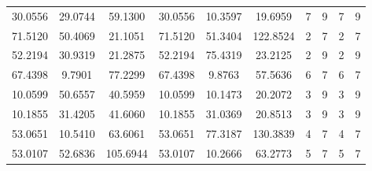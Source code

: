 \documentclass[withoutpreface,bwprint]{cumcmthesis} %
\begin{document}
\begin{appendices}
\begin{table}[htbp!]
\begin{tabular}{@{}cccccccccc@{}}
							30.0556                          & 29.0744                          & 59.1300                          & 30.0556                          & 10.3597                          & 19.6959                          & 7                    & 9                    & 7                      & 9                      \\
							71.5120                          & 50.4069                          & 21.1051                          & 71.5120                          & 51.3404                          & 122.8524                         & 2                    & 7                    & 2                      & 7                      \\
							52.2194                          & 30.9319                          & 21.2875                          & 52.2194                          & 75.4319                          & 23.2125                          & 2                    & 9                    & 2                      & 9                      \\
							67.4398                          & 9.7901                           & 77.2299                          & 67.4398                          & 9.8763                           & 57.5636                          & 6                    & 7                    & 6                      & 7                      \\
							10.0599                          & 50.6557                          & 40.5959                          & 10.0599                          & 10.1473                          & 20.2072                          & 3                    & 9                    & 3                      & 9                      \\
							10.1855                          & 31.4205                          & 41.6060                          & 10.1855                          & 31.0369                          & 20.8513                          & 3                    & 9                    & 3                      & 9                      \\
							53.0651                          & 10.5410                          & 63.6061                          & 53.0651                          & 77.3187                          & 130.3839                         & 4                    & 7                    & 4                      & 7                      \\
							53.0107                          & 52.6836                          & 105.6944                         & 53.0107                          & 10.2666                          & 63.2773                          & 5                    & 7                    & 5                      & 7                      \\

\end{tabular}
\end{table}
\end{appendices}
\end{document}
